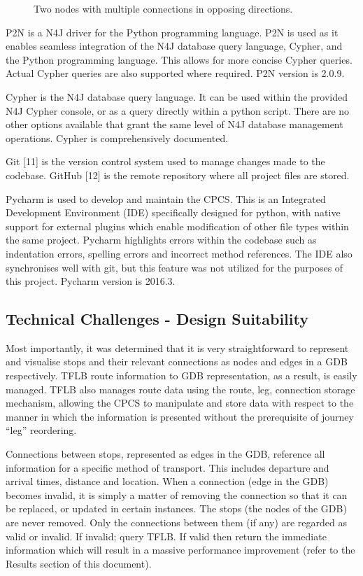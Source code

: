 \documentclass[12pt]{article}   	%
\begin{document}
\noindent
\hfill
\begin{figure}[htp]

\caption{Two nodes with multiple connections in opposing directions.}
\end{figure}
\hfill

P2N is a N4J driver for the Python programming language. P2N is used as it enables seamless integration of the N4J database query language, Cypher, and the Python programming language. This allows for more concise Cypher queries. Actual Cypher queries are also supported where required. P2N version is 2.0.9.

Cypher is the N4J database query language. It can be used within the provided N4J Cypher console, or as a query directly within a python script. There are no other options available that grant the same level of N4J database management operations. Cypher is comprehensively documented.

Git [11] is the version control system used to manage changes made to the codebase. GitHub [12] is the remote repository where all project files are stored.

Pycharm is used to develop and maintain the CPCS. This is an Integrated Development Environment (IDE) specifically designed for python, with native support for external plugins which enable modification of other file types within the same project. Pycharm highlights errors within the codebase such as indentation errors, spelling errors and incorrect method references. The IDE also synchronises well with git, but this feature was not utilized for the purposes of this project. Pycharm version is 2016.3.

\subsection{Technical Challenges - Design Suitability}
Most importantly, it was determined that it is very straightforward to represent and visualise stops and their relevant connections as nodes and edges in a GDB respectively. TFLB route information to GDB representation, as a result, is easily managed. TFLB also manages route data using the route, leg, connection storage mechanism, allowing the CPCS to manipulate and store data with respect to the manner in which the information is presented without the prerequisite of journey “leg” reordering.

Connections between stops, represented as edges in the GDB, reference all information for a specific method of transport. This includes departure and arrival times, distance and location. When a connection (edge in the GDB) becomes invalid, it is simply a matter of removing the connection so that it can be replaced, or updated in certain instances. The stops (the nodes of the GDB) are never removed. Only the connections between them (if any) are regarded as valid or invalid. If invalid; query TFLB. If valid then return the immediate information which will result in a massive performance improvement (refer to the Results section of this document).
\end{document}
